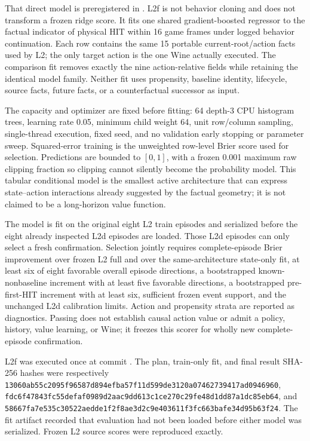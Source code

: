 \documentclass[11pt]{article}
\begin{document}
That direct model is preregistered in
.  L2f is not behavior
cloning and does not transform a frozen ridge score.  It fits one shared
gradient-boosted regressor to the factual indicator of physical HIT within 16
game frames under logged behavior continuation.  Each row contains the same
15 portable current-root/action facts used by L2; the only target action is the
one Wine actually executed.  The comparison fit removes exactly the nine
action-relative fields while retaining the identical model family.  Neither
fit uses propensity, baseline identity, lifecycle, source facts, future facts,
or a counterfactual successor as input.

The capacity and optimizer are fixed before fitting: 64 depth-3 CPU histogram
trees, learning rate 0.05, minimum child weight 64, unit row/column sampling,
single-thread execution, fixed seed, and no validation early stopping or
parameter sweep.  Squared-error training is the unweighted row-level Brier
score used for selection.  Predictions are bounded to $[0,1]$, with a frozen
0.001 maximum raw clipping fraction so clipping cannot silently become the
probability model.  This tabular conditional model is the smallest active
architecture that can express state--action interactions already suggested by
the factual geometry; it is not claimed to be a long-horizon value function.

The model is fit on the original eight L2 train episodes and serialized before
the eight already inspected L2d episodes are loaded.  Those L2d episodes can
only select a fresh confirmation.  Selection jointly requires complete-episode
Brier improvement over frozen L2 full and over the same-architecture state-only
fit, at least six of eight favorable overall episode directions, a bootstrapped
known-nonbaseline increment with at least five favorable directions, a
bootstrapped pre-first-HIT increment with at least six, sufficient frozen event
support, and the unchanged L2d calibration limits.  Action and propensity
strata are reported as diagnostics.  Passing does not establish causal action
value or admit a policy, history, value learning, or Wine; it freezes this
scorer for wholly new complete-episode confirmation.

L2f was executed once at commit
.  The plan, train-only fit,
and final result SHA-256 hashes were respectively
\texttt{13060ab55c2095f96587d894efba57f11d599de3120a07462739417ad0946960},
\texttt{fdc6f47843fc55defaf0989d2aac9dd613c1ce270c29fe48d1dd87a1dc85eb64},
and
\texttt{58667fa7e535c30522aedde1f2f8ae3d2c9e403611f3fc663bafe34d95b63f24}.
The fit artifact recorded that evaluation had not been loaded before either
model was serialized.  Frozen L2 source scores were reproduced exactly.
\end{document}
